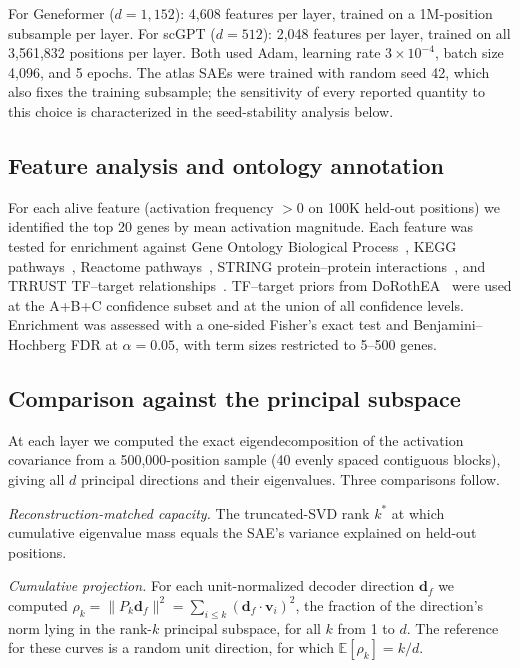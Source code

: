 \documentclass[onecolumn,11pt]{article}
\begin{document}
For Geneformer ($d{=}1{,}152$): 4,608 features per layer, trained on a 1M-position subsample per
layer. For scGPT ($d{=}512$): 2,048 features per layer, trained on all 3,561,832 positions per
layer. Both used Adam, learning rate $3 \times 10^{-4}$, batch size 4,096, and 5 epochs. The atlas
SAEs were trained with random seed 42, which also fixes the training subsample; the sensitivity of
every reported quantity to this choice is characterized in the seed-stability analysis below.

\subsection*{Feature analysis and ontology annotation}

For each alive feature (activation frequency $> 0$ on 100K held-out positions) we identified the
top 20 genes by mean activation magnitude. Each feature was tested for enrichment against Gene
Ontology Biological Process~\cite{ashburner2000go}, KEGG pathways~\cite{kanehisa2000kegg}, Reactome
pathways~\cite{jassal2020reactome}, STRING protein--protein interactions~\cite{szklarczyk2023string},
and TRRUST TF--target relationships~\cite{han2018trrust}. TF--target priors from
DoRothEA~\cite{garcia-alonso2019dorothea} were used at the A+B+C confidence subset and at the union
of all confidence levels. Enrichment was assessed with a one-sided Fisher's exact test and
Benjamini--Hochberg FDR at $\alpha = 0.05$, with term sizes restricted to 5--500 genes.

\subsection*{Comparison against the principal subspace}

At each layer we computed the exact eigendecomposition of the activation covariance from a
500,000-position sample (40 evenly spaced contiguous blocks), giving all $d$ principal directions
and their eigenvalues. Three comparisons follow.

\emph{Reconstruction-matched capacity.} The truncated-SVD rank $k^{*}$ at which cumulative
eigenvalue mass equals the SAE's variance explained on held-out positions.

\emph{Cumulative projection.} For each unit-normalized decoder direction $\mathbf{d}_f$ we computed
$\rho_k = \lVert P_k \mathbf{d}_f \rVert^2 = \sum_{i \le k} (\mathbf{d}_f \cdot \mathbf{v}_i)^2$,
the fraction of the direction's norm lying in the rank-$k$ principal subspace, for all $k$ from 1
to $d$. The reference for these curves is a random unit direction, for which
$\mathbb{E}[\rho_k] = k/d$.
\end{document}
